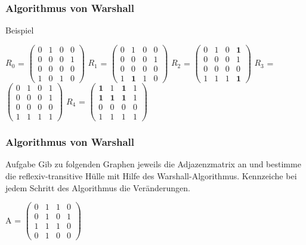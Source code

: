 \documentclass{beamer}
\begin{document}
\begin{frame}
	\frametitle{Algorithmus von Warshall}
	\begin{block}{Beispiel}
		\begin{center}
			$R_0$ =	
			$\begin{pmatrix}
				 0 & 1 & 0 & 0\\
				 0 & 0 & 0 & 1\\
				 0 & 0 & 0 & 0\\
				 1 & 0 & 1 & 0
			\end{pmatrix}$
			$R_1$ =	
			$\begin{pmatrix}
				 0 & 1 & 0 & 0\\
				 0 & 0 & 0 & 1\\
				 0 & 0 & 0 & 0\\
				 1 & \mathbf{1} & 1 & 0
			\end{pmatrix}$
			$R_2$ =	
			$\begin{pmatrix}
				 0 & 1 & 0 & \mathbf{1}\\
				 0 & 0 & 0 & 1\\
				 0 & 0 & 0 & 0\\
				 1 & 1 & 1 & \mathbf{1}
			\end{pmatrix}$
			$R_3$ =	
			$\begin{pmatrix}
				 0 & 1 & 0 & 1\\
				 0 & 0 & 0 & 1\\
				 0 & 0 & 0 & 0\\
				 1 & 1 & 1 & 1
			\end{pmatrix}$
			$R_4$ =	
			$\begin{pmatrix}
				 \mathbf{1} & 1 & \mathbf{1} & 1\\
				 \mathbf{1} & \mathbf{1} & \mathbf{1} & 1\\
				 0 & 0 & 0 & 0\\
				 1 & 1 & 1 & 1
			\end{pmatrix}$
		\end{center}
	\end{block}
\end{frame}

\begin{frame}
	\frametitle{Algorithmus von Warshall}
	\begin{block}{Aufgabe}
	Gib zu folgenden Graphen jeweils die Adjazenzmatrix an und bestimme die 
	reflexiv-transitive H\"ulle mit Hilfe des Warshall-Algorithmus. Kennzeiche 
	bei jedem Schritt des Algorithmus die Ver\"anderungen.
		\begin{center}		
			A =	
			$\begin{pmatrix}
				 0 & 1 & 1 & 0\\
				 0 & 1 & 0 & 1\\
				 1 & 1 & 1 & 0\\
				 0 & 1 & 0 & 0
			\end{pmatrix}$
		\end{center}
	\end{block}
\end{frame}
\end{document}

